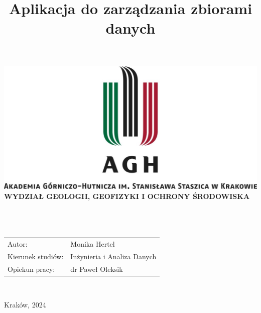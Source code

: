 \documentclass[12pt,a4paper,twoside]{article}
\title{Aplikacja do zarządzania zbiorami danych}
\begin{document}
\thispagestyle{empty}
\begin{center}
\includegraphics[width=\textwidth]{img/logo_AGH.jpg}\\
{\bf{\sf WYDZIAŁ GEOLOGII, GEOFIZYKI I OCHRONY ŚRODOWISKA}}\\[5mm]
{\bf{}}\\[14mm]

{}\\[12mm] 
{}\\[40mm]
\end{center}
{\sf\begin{tabular}{ll}
	Autor: & Monika Hertel\\
	Kierunek studiów: & Inżynieria i Analiza Danych\\
	Opiekun pracy: & dr Paweł Oleksik\\
\end{tabular}}\\[10mm]
\begin{center}
{\sf Kraków, 2024}
\end{center}
\newpage
\end{document}
